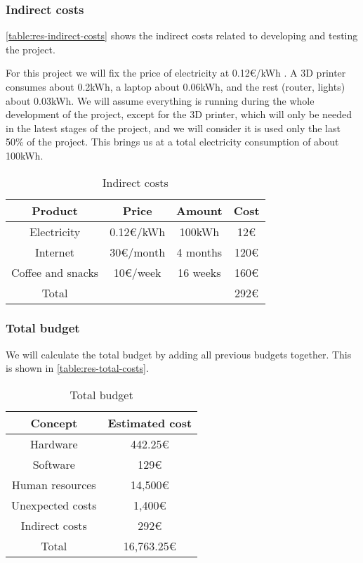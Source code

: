 \subsubsection{Indirect costs}

\autoref{table:res-indirect-costs}
shows the indirect costs related to developing and testing the project.

For this project we will fix the price of electricity at 0.12€/kWh \cite{price-electricity-endesa}. A 3D printer consumes about 0.2kWh, a laptop about 0.06kWh, and the rest (router, lights) about 0.03kWh. We will assume everything is running during the whole development of the project, except for the 3D printer, which will only be needed in the latest stages of the project, and we will consider it is used only the last 50\% of the project. This brings us at a total electricity consumption of about 100kWh.

\FloatBarrier
\begin{table}[h!]
\centering
\begin{tabular}{ |c|c|c|c| } 
    \hline
    Product & Price & Amount & Cost \\
    \hline
    \hline
    Electricity & 0.12€/kWh & 100kWh & 12€ \\
    \hline
    Internet & 30€/month & 4 months & 120€ \\
    \hline
    Coffee and snacks & 10€/week & 16 weeks & 160€ \\
    \hline
    \hline
    Total & & & 292€ \\
    \hline
\end{tabular}
\caption{Indirect costs \cite{price-electricity-endesa, price-vodafone-adsl, price-coffee-nespresso}}\label{table:res-indirect-costs}
\end{table}
\FloatBarrier

\subsubsection{Total budget}
We will calculate the total budget by adding all previous budgets together. This is shown in \autoref{table:res-total-costs}.

\FloatBarrier
\begin{table}[h!]
\centering
\begin{tabular}{ |c|c| } 
    \hline
    Concept & Estimated cost \\
    \hline
    \hline
    Hardware & 442.25€ \\
    \hline
    Software & 129€ \\
    \hline
    Human resources & 14,500€ \\
    \hline
    Unexpected costs & 1,400€ \\
    \hline
    Indirect costs & 292€ \\
    \hline
    \hline
    Total & 16,763.25€ \\
    \hline
\end{tabular}
\caption{Total budget}\label{table:res-total-costs}
\end{table}
\FloatBarrier

